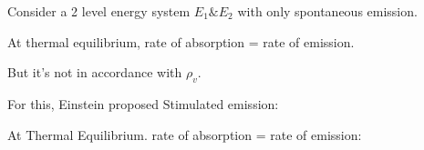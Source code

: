 \documentclass[12pt, a4paper]{article}
\begin{document}

\begin{framed}


	Consider a 2 level energy system $E_1 \& E_2$ with only spontaneous emission.

	At thermal equilibrium, rate of absorption = rate of emission.
	\bigskip


	\bigskip

	But it's not in accordance with $\rho_v$.

	For this, Einstein proposed Stimulated emission:

	At Thermal Equilibrium. rate of absorption = rate of emission:



\end{framed}
\end{document}
